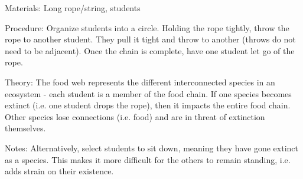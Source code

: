 \begin{multicols}{2}
\begin{description*}
\item[Materials:]{Long rope/string, students}
\item[Procedure:]{Organize students into a circle. Holding the rope tightly, throw the rope to another student. They pull it tight and throw to another (throws do not need to be adjacent). Once the chain is complete, have one student let go of the rope.}
\item[Theory:]{The food web represents the different interconnected species in an ecosystem - each student is a member of the food chain. If one species becomes extinct (i.e. one student drops the rope), then it impacts the entire food chain. Other species lose connections (i.e. food) and are in threat of extinction themselves.}
\item[Notes:]{Alternatively, select students to sit down, meaning they have gone extinct as a species. This makes it more difficult for the others to remain standing, i.e. adds strain on their existence.}
\end{description*}



\end{multicols}

\pagebreak
